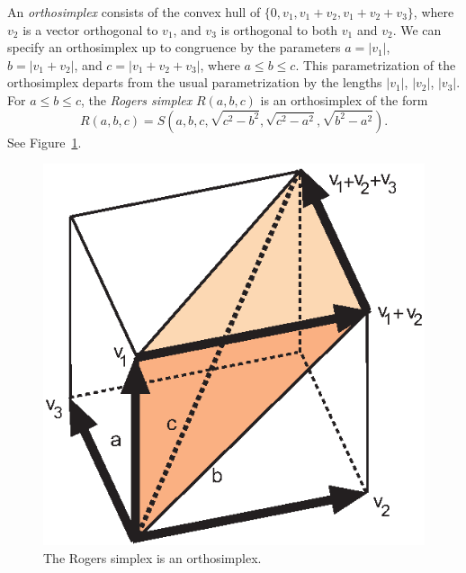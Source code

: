 \begin{definition} \label{def:rogers}
An {\it orthosimplex} consists of the convex hull of
$\{0,v_1,v_1+v_2,v_1+v_2+v_3\}$, where $v_2$ is a vector
orthogonal to $v_1$, and $v_3$ is orthogonal to both $v_1$ and
$v_2$.  We can specify an orthosimplex up to congruence by the
parameters $a = |v_1|$, $b=|v_1+v_2|$, and $c=|v_1+v_2+v_3|$,
where $a\le b\le c$. This parametrization of the orthosimplex
departs from the usual parametrization by the lengths $|v_1|$,
$|v_2|$, $|v_3|$. For $a\le b\le c$,  the {\it Rogers simplex\/}
$R(a,b,c)$ is an orthosimplex of the form
$$R(a,b,c)=S(a,b,c,\sqrt{c^2-b^2},\sqrt{c^2-a^2},\sqrt{b^2-a^2}).$$
See Figure~\ref{fig:rogers}.
%
\end{definition}

\begin{figure}[htb]
  \centering
  \includegraphics{PS/rogers.eps}
  \caption{The Rogers simplex is an orthosimplex.}
  \label{fig:rogers}
\end{figure}

